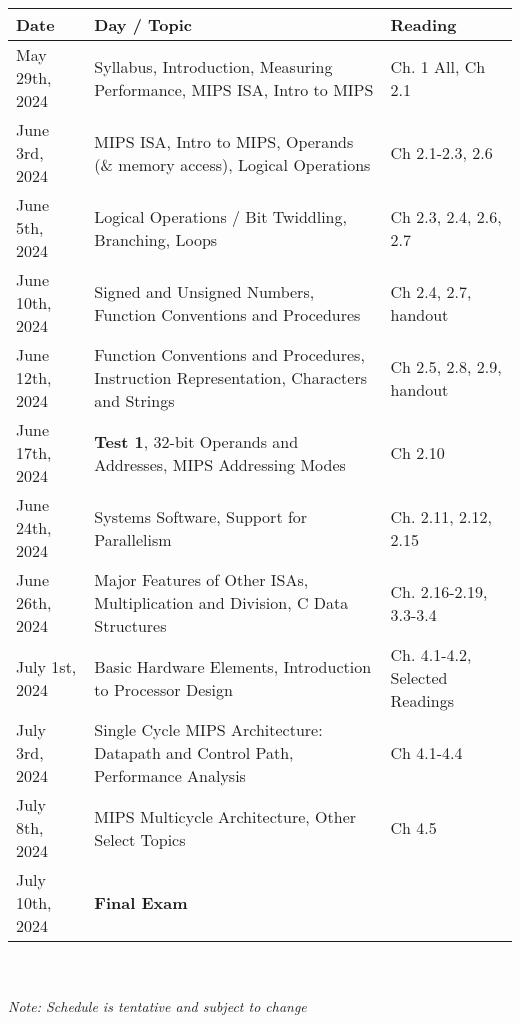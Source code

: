 \renewcommand{\arraystretch}{1.5}
\begin{tabular}{ | l | L{9cm} | L{3cm} | }
    \hline
    Date & Day / Topic & Reading \\
    \hline
    May 29th, 2024 & Syllabus, Introduction, Measuring Performance, MIPS ISA, Intro to MIPS & Ch. 1 All, Ch 2.1 \\
    \hline
    June 3rd, 2024 & MIPS ISA, Intro to MIPS, Operands (\& memory access), Logical Operations & Ch 2.1-2.3, 2.6 \\
    \hline
    June 5th, 2024 & Logical Operations / Bit Twiddling, Branching, Loops & Ch 2.3, 2.4, 2.6, 2.7 \\
    \hline
    June 10th, 2024 & Signed and Unsigned Numbers, Function Conventions and Procedures & Ch 2.4, 2.7, handout \\
    \hline
    June 12th, 2024 & Function Conventions and Procedures, Instruction Representation, Characters and Strings & Ch 2.5, 2.8, 2.9, handout \\
    \hline
    June 17th, 2024 & \textbf{Test 1}, 32-bit Operands and Addresses, MIPS Addressing Modes & Ch 2.10 \\
    \hline
    June 24th, 2024 & Systems Software, Support for Parallelism & Ch. 2.11, 2.12, 2.15 \\
    \hline
    June 26th, 2024 & Major Features of Other ISAs, Multiplication and Division, C Data Structures & Ch. 2.16-2.19, 3.3-3.4 \\
    \hline
    July 1st, 2024 & Basic Hardware Elements, Introduction to Processor Design & Ch. 4.1-4.2, Selected Readings \\
    \hline
    July 3rd, 2024 & Single Cycle MIPS Architecture: Datapath and Control Path, Performance Analysis & Ch 4.1-4.4 \\
    \hline
    July 8th, 2024 & MIPS Multicycle Architecture, Other Select Topics & Ch 4.5 \\
    \hline 
    July 10th, 2024 & \textbf{Final Exam} & \\
    \hline
\end{tabular}
\\ \\
\textit{Note: Schedule is tentative and subject to change}



